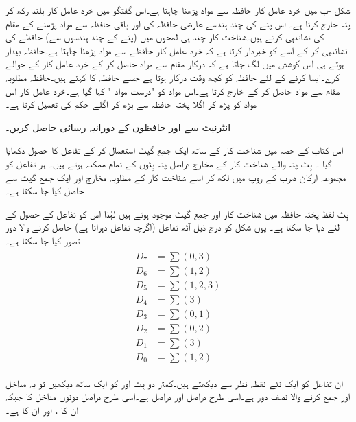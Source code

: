 شکل -ب  میں خرد عامل کار حافظہ سے مواد پڑھنا چاہتا ہے۔اس گفتگو میں خرد عامل کار       بلند رکھ کر پتہ خارج کرتا ہے۔ اس پتے کی چند ہندسے عارضی حافظہ کی   اور باقی حافظہ سے مواد پڑھنے کے مقام کی نشاندہی کرتے ہیں۔شناخت کار چند ہی لمحوں میں   (پتے کے  چند  ہندسوں سے) حافظے کی نشاندہی کر کے اسے کو خبردار کرتا ہے کہ خرد عامل کار حافظے  سے مواد پڑھنا چاہتا ہے۔حافظہ بیدار ہوتے ہی اس کوشش میں لگ جاتا ہے کہ درکار مقام سے مواد حاصل کر کے خرد عامل کار کے حوالے کرے۔ایسا کرنے کے لئے حافظہ کو کچھ وقت درکار ہوتا ہے جسے  حافظہ کا  کہتے ہیں۔حافظہ مطلوبہ مقام سے مواد حاصل کر کے خارج کرتا ہے۔اس مواد کو "درست مواد "  کہا گیا ہے۔خرد عامل کار اس مواد کو پڑھ کر  اگلا  پختہ حافظہ سے بڑھ کر اگلے حکم کی تعمیل کرتا ہے۔

انٹرنیٹ سے  اور  حافظوں کے دورانیہ رسائی حاصل کریں۔

اس کتاب کے حصہ   میں شناخت کار  کے ساتھ  ایک جمع گیٹ  استعمال کر کے  تفاعل کا حصول  دکھایا گیا ۔  بِٹ پتہ   والے  شناخت کار کے   مخارج دراصل پتہ   بِٹوں کے تمام ممکنہ   ہوتے ہیں۔  ہر تفاعل کو مجموعہ ارکان ضرب کے روپ  میں لکھ کر اسے شناخت کار کے مطلوبہ مخارج اور ایک  جمع گیٹ سے حاصل کیا جا سکتا ہے۔ 

 بِٹ  لفظ    پختہ حافظہ میں  شناخت کار اور   جمع گیٹ موجود ہوتے ہیں لہٰذا اس  کو   تفاعل کے حصول کے لئے  دیا جا سکتا ہے۔ یوں  شکل   کو درج ذیل  آٹھ تفاعل (اگرچہ    تفاعل  دہراتا ہے)  حاصل کرنے والا دور  تصور کیا جا سکتا ہے۔
\begin{gather}
\begin{aligned}
D_7&=\sum (0,3)\\
D_6&=\sum(1,2)\\
D_5&=\sum (1,2,3)\\
D_4&=\sum(3)\\
D_3&=\sum(0,1)\\
D_2&=\sum (0,2)\\
D_1&=\sum(3)\\
D_0&=\sum(1,2)
\end{aligned}
\end{gather}

ان  تفاعل کو ایک  نئے نقطہ نظر سے دیکھتے ہیں۔کمتر دو بِٹ   اور   کو  ایک ساتھ دیکھیں تو یہ مداخل    اور  جمع کرنے والا نصف دور ہے۔اسی طرح  دراصل   اور  دراصل   ہے۔اسی طرح   دراصل دونوں مداخل کا    جبکہ   ان کا ،   اور  ان کا ہے۔
